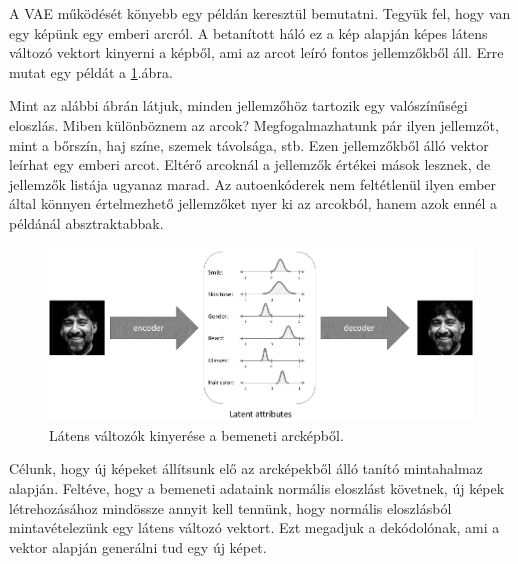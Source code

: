 
A VAE működését könyebb egy példán keresztül bemutatni. Tegyük fel, hogy van egy képünk egy emberi arcról. A betanított háló ez a kép alapján képes látens változó vektort kinyerni a képből, ami az arcot leíró fontos jellemzőkből áll. Erre mutat egy példát a \ref{fig:vae_face}.ábra.


Mint az alábbi ábrán látjuk, minden jellemzőhöz tartozik egy valószínűségi eloszlás. Miben különböznem az arcok? Megfogalmazhatunk pár ilyen jellemzőt, mint a bőrszín, haj színe, szemek távolsága, stb. Ezen jellemzőkből álló vektor leírhat egy emberi arcot. Eltérő arcoknál a jellemzők értékei mások lesznek, de jellemzők listája ugyanaz marad. Az autoenkóderek nem feltétlenül ilyen ember által könnyen értelmezhető jellemzőket nyer ki az arcokból, hanem azok ennél a példánál absztraktabbak.

\begin{figure}[ht]
	\centering
	\includegraphics[width=1\columnwidth]{figures/autoenc_latent.png}
	\caption{Látens változók kinyerése a bemeneti arcképből.}
	\label{fig:vae_face}
\end{figure}

Célunk, hogy új képeket állítsunk elő az arcképekből álló tanító mintahalmaz alapján. Feltéve, hogy a bemeneti adataink normális eloszlást követnek, új képek létrehozásához mindössze annyit kell tennünk, hogy normális eloszlásból mintavételezünk egy látens változó vektort. Ezt megadjuk a dekódolónak, ami a vektor alapján generálni tud egy új képet.

